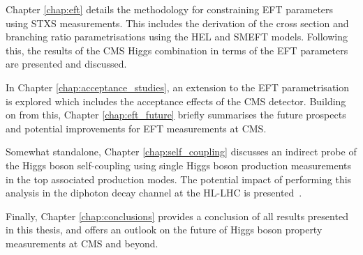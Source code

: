 Chapter {\color{blue}\ref{chap:eft}} details the methodology for constraining EFT parameters using STXS measurements. This includes the derivation of the cross section and branching ratio parametrisations using the HEL and SMEFT models. Following this, the results of the CMS Higgs combination in terms of the EFT parameters are presented and discussed.

In Chapter {\color{blue}\ref{chap:acceptance_studies}}, an extension to the EFT parametrisation is explored which includes the acceptance effects of the CMS detector. Building on from this, Chapter {\color{blue}\ref{chap:eft_future}} briefly summarises the future prospects and potential improvements for EFT measurements at CMS.

Somewhat standalone, Chapter {\color{blue}\ref{chap:self_coupling}} discusses an indirect probe of the Higgs boson self-coupling using single Higgs boson production measurements in the top associated production modes. The potential impact of performing this analysis in the diphoton decay channel at the HL-LHC is presented~\cite{}.

Finally, Chapter {\color{blue}\ref{chap:conclusions}} provides a conclusion of all results presented in this thesis, and offers an outlook on the future of Higgs boson property measurements at CMS and beyond.